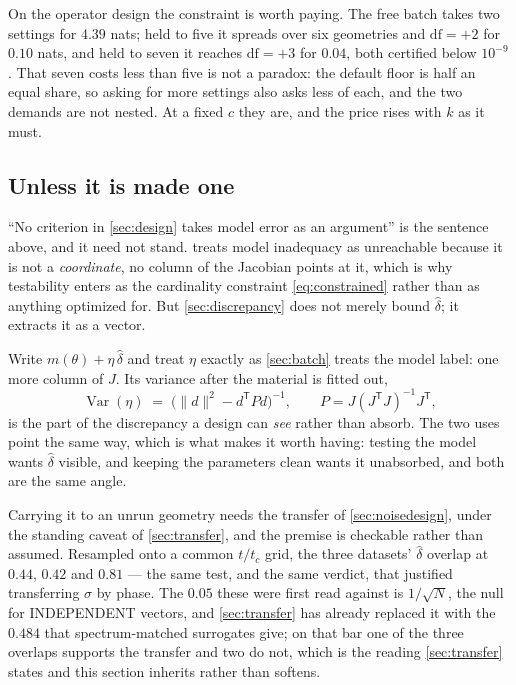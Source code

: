 \documentclass[10pt]{article}
\begin{document}
On the operator design the constraint is worth paying. The free batch takes two settings for
$4.39$ nats; held to five it spreads over six geometries and $\mathrm{df} = +2$ for $0.10$ nats,
and held to seven it reaches $\mathrm{df} = +3$ for $0.04$, both certified below $10^{-9}$.
That seven costs less than five is not a paradox: the default floor is half an equal share, so
asking for more settings also asks less of each, and the two demands are not nested. At a fixed
$c$ they are, and the price rises with $k$ as it must.

\subsection*{Unless it is made one}
\label{sec:deltadesign}

``No criterion in \cref{sec:design} takes model error as an argument'' is the sentence above,
and it need not stand.  treats model inadequacy as unreachable because it is not a
\emph{coordinate}, no column of the Jacobian points at it, which is why testability enters
as the cardinality constraint \eqref{eq:constrained} rather than as anything optimized for. But
\cref{sec:discrepancy} does not merely bound $\hat\delta$; it extracts it as a vector.

Write $m(\theta) + \eta\,\hat\delta$ and treat $\eta$ exactly as \cref{sec:batch} treats the model
label: one more column of $J$. Its variance after the material is fitted out,
%
\begin{equation}
\operatorname{Var}(\eta) \;=\; \Big(\lVert d\rVert^2 - d^{\mathsf T} P d\Big)^{-1},
\qquad P = J(J^{\mathsf T}J)^{-1}J^{\mathsf T},
\label{eq:deltacoordinate}
\end{equation}
%
is the part of the discrepancy a design can \emph{see} rather than absorb. The two uses point the
same way, which is what makes it worth having: testing the model wants $\hat\delta$ visible, and
keeping the parameters clean wants it unabsorbed, and both are the same angle.

Carrying it to an unrun geometry needs the transfer of \cref{sec:noisedesign}, under the standing
caveat of \cref{sec:transfer}, and the premise is checkable rather than assumed. Resampled onto a common $t/t_c$ grid, the three datasets'
$\hat\delta$ overlap at $0.44$, $0.42$ and $0.81$ --- the same test, and the same verdict, that
justified transferring $\sigma$ by phase. The $0.05$ these were first read against is
$1/\sqrt{N}$, the null for INDEPENDENT vectors, and \cref{sec:transfer} has already replaced it
with the $0.484$ that spectrum-matched surrogates give; on that bar one of the three overlaps
supports the transfer and two do not, which is the reading \cref{sec:transfer} states and this
section inherits rather than softens.
\end{document}

